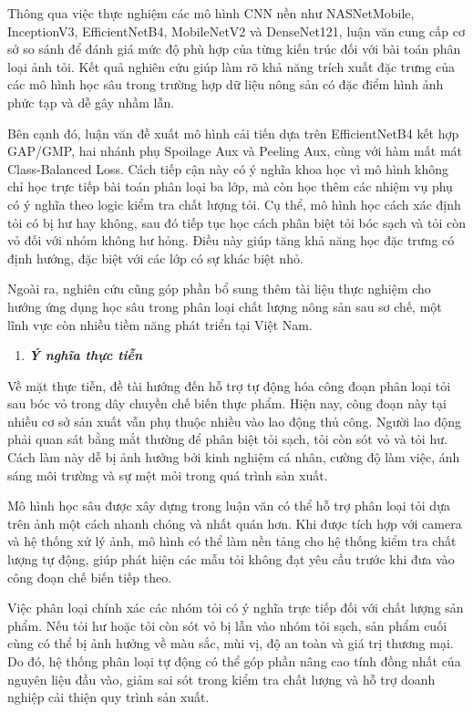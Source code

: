 \documentclass[
]{article}
\begin{document}
Thông qua việc thực nghiệm các mô hình CNN nền như NASNetMobile,
InceptionV3, EfficientNetB4, MobileNetV2 và DenseNet121, luận văn cung
cấp cơ sở so sánh để đánh giá mức độ phù hợp của từng kiến trúc đối với
bài toán phân loại ảnh tỏi. Kết quả nghiên cứu giúp làm rõ khả năng
trích xuất đặc trưng của các mô hình học sâu trong trường hợp dữ liệu
nông sản có đặc điểm hình ảnh phức tạp và dễ gây nhầm lẫn.

Bên cạnh đó, luận văn đề xuất mô hình cải tiến dựa trên EfficientNetB4
kết hợp GAP/GMP, hai nhánh phụ Spoilage Aux và Peeling Aux, cùng với hàm
mất mát Class-Balanced Loss. Cách tiếp cận này có ý nghĩa khoa học vì mô
hình không chỉ học trực tiếp bài toán phân loại ba lớp, mà còn học thêm
các nhiệm vụ phụ có ý nghĩa theo logic kiểm tra chất lượng tỏi. Cụ thể,
mô hình học cách xác định tỏi có bị hư hay không, sau đó tiếp tục học
cách phân biệt tỏi bóc sạch và tỏi còn vỏ đối với nhóm không hư hỏng.
Điều này giúp tăng khả năng học đặc trưng có định hướng, đặc biệt với
các lớp có sự khác biệt nhỏ.

Ngoài ra, nghiên cứu cũng góp phần bổ sung thêm tài liệu thực nghiệm cho
hướng ứng dụng học sâu trong phân loại chất lượng nông sản sau sơ chế,
một lĩnh vực còn nhiều tiềm năng phát triển tại Việt Nam.

\begin{enumerate}
\def\labelenumi{\arabic{enumi}.}
\setcounter{enumi}{1}
\item
  \protect{}\label{_Toc232111990}{}\emph{\textbf{Ý nghĩa
  thực tiễn}}
\end{enumerate}

Về mặt thực tiễn, đề tài hướng đến hỗ trợ tự động hóa công đoạn phân
loại tỏi sau bóc vỏ trong dây chuyền chế biến thực phẩm. Hiện nay, công
đoạn này tại nhiều cơ sở sản xuất vẫn phụ thuộc nhiều vào lao động thủ
công. Người lao động phải quan sát bằng mắt thường để phân biệt tỏi
sạch, tỏi còn sót vỏ và tỏi hư. Cách làm này dễ bị ảnh hưởng bởi kinh
nghiệm cá nhân, cường độ làm việc, ánh sáng môi trường và sự mệt mỏi
trong quá trình sản xuất.

Mô hình học sâu được xây dựng trong luận văn có thể hỗ trợ phân loại tỏi
dựa trên ảnh một cách nhanh chóng và nhất quán hơn. Khi được tích hợp
với camera và hệ thống xử lý ảnh, mô hình có thể làm nền tảng cho hệ
thống kiểm tra chất lượng tự động, giúp phát hiện các mẫu tỏi không đạt
yêu cầu trước khi đưa vào công đoạn chế biến tiếp theo.

Việc phân loại chính xác các nhóm tỏi có ý nghĩa trực tiếp đối với chất
lượng sản phẩm. Nếu tỏi hư hoặc tỏi còn sót vỏ bị lẫn vào nhóm tỏi sạch,
sản phẩm cuối cùng có thể bị ảnh hưởng về màu sắc, mùi vị, độ an toàn và
giá trị thương mại. Do đó, hệ thống phân loại tự động có thể góp phần
nâng cao tính đồng nhất của nguyên liệu đầu vào, giảm sai sót trong kiểm
tra chất lượng và hỗ trợ doanh nghiệp cải thiện quy trình sản xuất.
\end{document}
